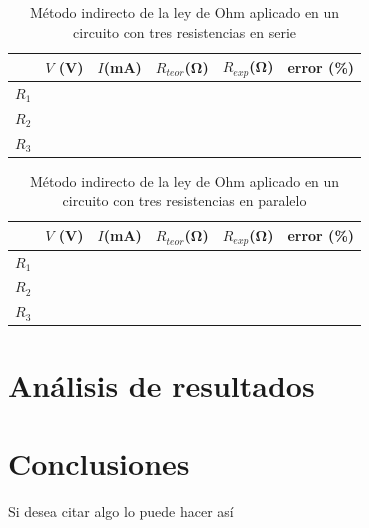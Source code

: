\documentclass[12pt,letterpaper]{article}
\begin{document}
\begin{table}[H]
	\caption{Método indirecto de la ley de Ohm aplicado en un circuito con tres resistencias en serie}
	\label{tab:L1T3}
	\centering
	\vspace{0.5cm}
    \begin{tabularx}{14cm}{CCCCCC}
		\toprule
		& $V$ (\si{V}) & $I$(\si{\milli\ampere}) & $R_{teor}$(\si{\ohm}) & $R_{exp}$(\si{\ohm}) & error (\%)\\
		\midrule
		$R_1$ & & & & & \\
		$R_2$ & & & & & \\
		$R_3$ & & & & & \\
		\bottomrule
	\end{tabularx}
\end{table}

\begin{table}[H]
	\caption{Método indirecto de la ley de Ohm aplicado en un circuito con tres resistencias en paralelo}
	\label{tab:L1T4}
	\centering
	\vspace{0.5cm}
    \begin{tabularx}{14cm}{CCCCCC}
		\toprule
		&$V$ (\si{V}) & $I$(\si{\milli\ampere}) & $R_{teor}$(\si{\ohm}) & $R_{exp}$(\si{\ohm}) & error (\%)\\
		\midrule
		$R_1$ & & & & & \\
		$R_2$ & & & & & \\
		$R_3$ & & & & & \\
		\bottomrule
	\end{tabularx}
\end{table}

\section{Análisis de resultados}

\section{Conclusiones}

Si desea citar algo lo puede hacer así \cite{alexander2006fundamentos}








\end{document}
